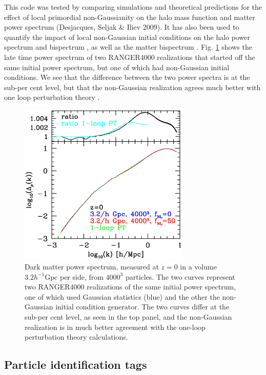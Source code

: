 \documentclass[useAMS,usenatbib]{mn2e}
\begin{document}
This code was tested by comparing simulations and theoretical predictions
for the effect of local primordial non-Gaussianity on the halo mass 
function and matter power spectrum (Desjacques, Seljak \& Iliev 2009). 
It has also been used to quantify the impact of local non-Gaussian initial
conditions on the halo power spectrum \citep{2009MNRAS.396...85D,
2010PhRvD..81b3006D} and bispectrum \citep{2010MNRAS.406.1014S},
 as well as the matter bispectrum \citep{2011arXiv1111.6966S}.
Fig. \ref{fig:init} shows the late time power spectrum of two RANGER4000 realizations that started off the same initial power spectrum, 
but one of which had non-Gaussian initial conditions.
We see that the difference between the two power spectra is at the sub-per cent level, but that the non-Gaussian realization
agrees much better with one loop perturbation theory \citep{2004PhRvD..69j3513S,2008PhRvD..78l3534T}.

\begin{figure}%
  \begin{center}
    \includegraphics[width=3.2in]{graphs/dm_power_z0_fNL0_50_w_1loop_PT.eps}
  \caption{ Dark matter power spectrum, measured at $z=0$ in a volume $3.2 h^{-1}\mbox{Gpc}$ per side,
  from $4000^3$ particles. The two curves represent two RANGER4000 realizations of the same initial power spectrum, one of which used Gaussian statistics (blue) and the other the non-Gaussian initial condition generator. The two curves differ at the sub-per cent level, as seen in the top panel,
  and the non-Gaussian realization is in much better agreement with the one-loop perturbation theory calculations.   
    \label{fig:init}}
\end{center}
\end{figure}

\subsection{Particle identification tags}
\label{PID}
\end{document}
